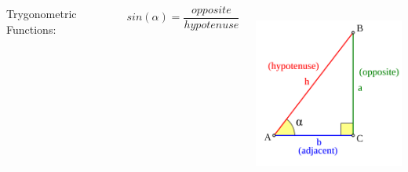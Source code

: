 \documentclass[]{beamer}
\begin{document}
\begin{frame}

   \begin{columns}[c]
      \column{2in}  %
      Trygonometric Functions:
   

   
   \begin{equation*}
   sin(\alpha) =\frac{opposite}{hypotenuse}
   \end{equation*}
   

   
     
      \column{2.5in}
   
   
   
   
     \begin{center}
     \includegraphics[height=2.3in]{images/triangle.png}
   \end{center}
   
   
      \end{columns}

 \end{frame}
\end{document}
